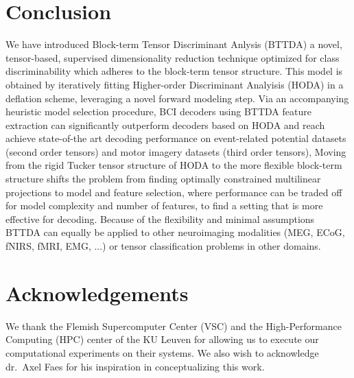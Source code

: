 \documentclass[twocolumn]{article}
\begin{document}
\section{Conclusion}
We have introduced Block-term Tensor Discriminant Anlysis (BTTDA) a novel,
tensor-based, supervised dimensionality reduction technique optimized for class
discriminability which adheres to the block-term tensor structure.
This model is obtained by iteratively fitting Higher-order Discriminant
Analyisis (HODA) in a deflation scheme, leveraging a novel forward modeling
step.
Via an accompanying heuristic model selection procedure, BCI decoders using BTTDA
feature extraction can significantly outperform decoders based on HODA and
reach achieve state-of-the art decoding performance on event-related potential datasets
(second order tensors) and motor imagery datasets (third order tensors),
Moving from the rigid Tucker tensor structure of HODA to the more flexible
block-term structure shifts the problem from finding optimally constrained multilinear
projections to model and feature selection, where performance can be traded
off for model complexity and number of features, to find a setting that is more
effective for decoding.
Because of the flexibility and minimal assumptions BTTDA
can equally be applied to other neuroimaging modalities (MEG, ECoG, fNIRS,
fMRI, EMG, ...) or tensor classification problems in other domains.

\section*{Acknowledgements}
We thank the Flemish Supercomputer Center (VSC) and the High-Performance
Computing (HPC) center of the KU Leuven for allowing us to execute our
computational experiments on their systems.
We also wish to acknowledge dr.\ Axel Faes for his inspiration in conceptualizing this
work.

\printbibliography
\end{document}

